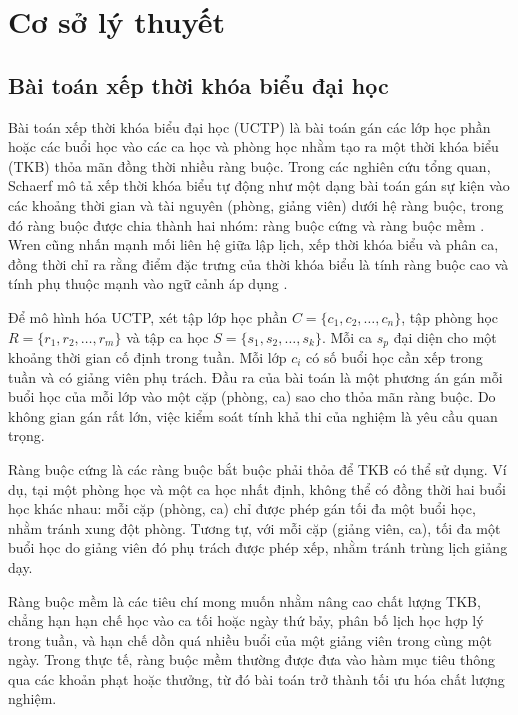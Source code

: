 \documentclass[a4paper,12pt,oneside]{article}
\begin{document}
	\section{Cơ sở lý thuyết}
	
	\subsection{Bài toán xếp thời khóa biểu đại học}
	
	Bài toán xếp thời khóa biểu đại học (UCTP) là bài toán gán các lớp học phần hoặc các buổi học vào các ca học và phòng học nhằm tạo ra một thời khóa biểu (TKB) thỏa mãn đồng thời nhiều ràng buộc. Trong các nghiên cứu tổng quan, Schaerf mô tả xếp thời khóa biểu tự động như một dạng bài toán gán sự kiện vào các khoảng thời gian và tài nguyên (phòng, giảng viên) dưới hệ ràng buộc, trong đó ràng buộc được chia thành hai nhóm: ràng buộc cứng và ràng buộc mềm \cite{schaerf1999survey}. Wren cũng nhấn mạnh mối liên hệ giữa lập lịch, xếp thời khóa biểu và phân ca, đồng thời chỉ ra rằng điểm đặc trưng của thời khóa biểu là tính ràng buộc cao và tính phụ thuộc mạnh vào ngữ cảnh áp dụng \cite{wren1995scheduling}.
	
	Để mô hình hóa UCTP, xét tập lớp học phần $C = \{c_1, c_2, \ldots, c_n\}$, tập phòng học $R = \{r_1, r_2, \ldots, r_m\}$ và tập ca học $S = \{s_1, s_2, \ldots, s_k\}$. Mỗi ca $s_p$ đại diện cho một khoảng thời gian cố định trong tuần. Mỗi lớp $c_i$ có số buổi học cần xếp trong tuần và có giảng viên phụ trách. Đầu ra của bài toán là một phương án gán mỗi buổi học của mỗi lớp vào một cặp (phòng, ca) sao cho thỏa mãn ràng buộc. Do không gian gán rất lớn, việc kiểm soát tính khả thi của nghiệm là yêu cầu quan trọng.
	
	Ràng buộc cứng là các ràng buộc bắt buộc phải thỏa để TKB có thể sử dụng. Ví dụ, tại một phòng học và một ca học nhất định, không thể có đồng thời hai buổi học khác nhau: mỗi cặp (phòng, ca) chỉ được phép gán tối đa một buổi học, nhằm tránh xung đột phòng. Tương tự, với mỗi cặp (giảng viên, ca), tối đa một buổi học do giảng viên đó phụ trách được phép xếp, nhằm tránh trùng lịch giảng dạy.
	
	Ràng buộc mềm là các tiêu chí mong muốn nhằm nâng cao chất lượng TKB, chẳng hạn hạn chế học vào ca tối hoặc ngày thứ bảy, phân bố lịch học hợp lý trong tuần, và hạn chế dồn quá nhiều buổi của một giảng viên trong cùng một ngày. Trong thực tế, ràng buộc mềm thường được đưa vào hàm mục tiêu thông qua các khoản phạt hoặc thưởng, từ đó bài toán trở thành tối ưu hóa chất lượng nghiệm.
	
\end{document}
